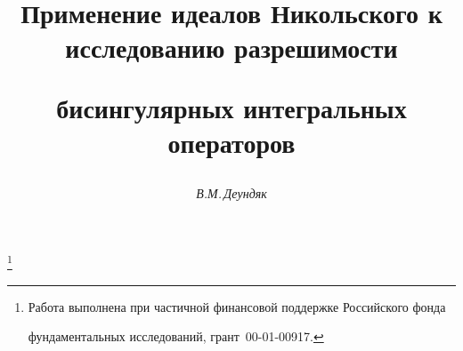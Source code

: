 

 




\newcommand{\Fr}{\operatorname{Fr}} 


\newcommand{\alg}{\operatorname{alg}} 


\newcommand{\id}{\operatorname{id}} 


\newcommand{\Int}{\operatorname{int}} 


\newcommand{\tts}[1]{} 


 




\setcounter{page}{85} 












 


\author{\it В.М.\,Деундяк} 




\title{Применение идеалов Никольского к исследованию разрешимости 


бисингулярных интегральных операторов} 


\thanks{Работа выполнена при частичной финансовой поддержке Российского фонда 


фундаментальных исследований, грант \No\,00-01-00917.} 


 


\date{} 




\pagestyle{plain} %


